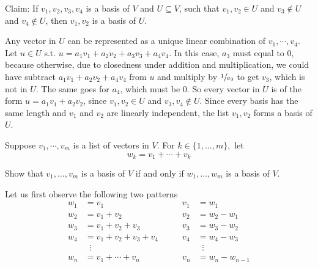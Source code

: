 \begin{xrcs}
  Claim: If $v_1, v_2, v_3, v_4$ is a basis of $V$ and $U \subseteq V$, such that $v_1, v_2 \in U$ and $v_3 \notin U$ and $v_4 \notin U$, then $v_1, v_2$ is a basis of $U$.
\end{xrcs}
\begin{prf}
  Any vector in $U$ can be represented as a unique linear combination of $v_1, \cdots, v_4$. Let $u\in U$ s.t. $u=a_1 v_1 + a_2 v_2 + a_3 v_3 + a_4 v_4$. In this case, $a_3$ must equal to $0$, because otherwise, due to closedness under addition and multiplication, we could have subtract $a_1 v_1 + a_2 v_2+a_4v_4$ from $u$ and multiply by $\sfrac{1}{a_3}$ to get $v_3$, which is not in $U$. The same goes for $a_4$, which must be $0$. So every vector in $U$ is of the form $u=a_1 v_1 + a_2 v_2$, since $v_1, v_2 \in U$ and $v_3, v_4 \notin U$. Since every basis has the same length and $v_1$ and $v_2$ are linearly independent, the list $v_1, v_2$ forms a basis of $U$.
\end{prf}

\begin{xrcs}
  Suppose $v_1, \cdots, v_m$ is a list of vectors in $V$. For $k \in \{1, \ldots, m\},$ let
  \begin{equation}
    w_k = v_1 + \cdots + v_k
  \end{equation}

  Show that $v_1, \ldots, v_m$ is a basis of $V$ if and only if $w_1, \ldots, w_m$ is a basis of $V$.
\end{xrcs}
\begin{prf}
  Let us first observe the following two patterns
  \begin{equation}
    \begin{aligned}
      w_1 &= v_1                    & \qquad v_1 &= w_1       \\
      w_2 &= v_1 + v_2              & \qquad v_2 &= w_2 - w_1 \\
      w_3 &= v_1 + v_2 + v_3        & \qquad v_3 &= w_3 - w_2 \\
      w_4 &= v_1 + v_2 + v_3 + v_4  & \qquad v_4 &= w_4 - w_3 \\
          &\;\;\vdots               &            &\;\;\vdots \\
      w_n &= v_1 + \cdots + v_n     & \qquad v_n &= w_n - w_{n-1}
    \end{aligned}
  \end{equation}
\end{prf}
